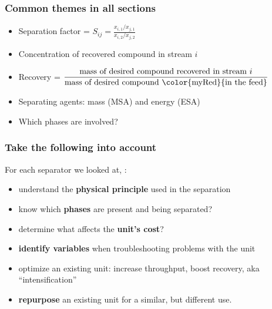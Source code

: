 \begin{frame}\frametitle{Common themes in all sections}
	\begin{itemize}
		\item	Separation factor = $S_{ij} = \displaystyle \frac{x_{i,1} / x_{j,1}}{x_{i,2} / x_{j,2}}$
		\item	Concentration of recovered compound in stream $i$
		\item	Recovery = $\displaystyle\frac{\text{mass of desired compound recovered in stream~} i}{\text{mass of desired compound {\color{myRed}{in the feed}}}}$
		\item	Separating agents: mass (MSA) and energy (ESA)
		\item	Which phases are involved?
	\end{itemize}
\end{frame}

\begin{frame}\frametitle{Take the following into account}
	For each separator we looked at, {\color{myOrange}{please aim to}}:
	\vspace{12pt}
	\begin{itemize}
		\item	understand the \textbf{physical principle} used in the separation
		\item	know which \textbf{phases} are present and being separated?
		\item	determine what affects the \textbf{unit's cost}?
		\item	\textbf{identify variables} when troubleshooting problems with the unit
		\item	optimize an existing unit: increase throughput, boost recovery, aka ``intensification''
		\item	\textbf{repurpose} an existing unit for a similar, but different use.
	\end{itemize}
\end{frame}


